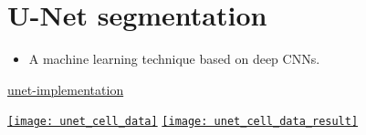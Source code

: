 \section{U-Net segmentation}

\begin{itemize}
\item A machine learning technique based on deep \glspl{CNN}.
\end{itemize}

\href{https://github.com/byrkbrk/unet-implementation?tab=readme-ov-file}{unet-implementation}

\begin{center}
  \href{https://github.com/vicente-gonzalez-ruiz/medical_imaging/blob/main/notebooks/unet_cell_data.ipynb}{\texttt{[image: unet\_cell\_data]}}
  \href{https://github.com/vicente-gonzalez-ruiz/medical_imaging/blob/main/notebooks/unet_cell_data.ipynb}{\texttt{[image: unet\_cell\_data\_result]}}
\end{center}

